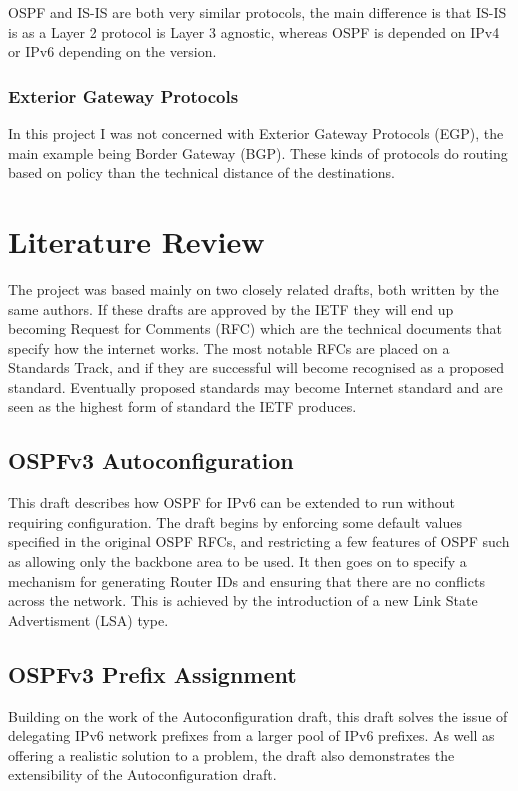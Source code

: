 \documentclass[12pt]{report}
\begin{document}
OSPF and IS-IS are both very similar protocols, the main difference is that
IS-IS is as a Layer 2 protocol is Layer 3 agnostic, whereas OSPF is depended on
IPv4 or IPv6 depending on the version.

\subsection{Exterior Gateway Protocols}
In this project I was not concerned with Exterior Gateway Protocols (EGP), the
main example being Border Gateway (BGP). These kinds of protocols do routing
based on policy than the technical distance of the destinations.

\chapter{Literature Review} 

The project was based mainly on two closely related drafts, both written by the same
authors. If these drafts are approved by the IETF they will end up becoming Request 
for Comments (RFC) which are the technical documents that specify how the internet 
works. The most notable RFCs are placed on a Standards Track, and if they are 
successful will become recognised as a proposed standard. Eventually proposed 
standards may become Internet standard and are seen as the highest form of standard 
the IETF produces. 

\section{OSPFv3 Autoconfiguration}
This draft describes how OSPF for IPv6 can be extended to run without requiring
configuration. The draft begins by enforcing some default values specified in the
original OSPF RFCs, and restricting a few features of OSPF such as allowing only the 
backbone area to be used. It then goes on to specify a mechanism for generating 
Router IDs and ensuring that there are no conflicts across the network. This is 
achieved by the introduction of a new Link State Advertisment (LSA) type.

\section{OSPFv3 Prefix Assignment}
Building on the work of the Autoconfiguration draft, this draft solves
the issue of delegating IPv6 network prefixes from a larger pool of IPv6 
prefixes. As well as offering a realistic solution to a problem, the draft 
also demonstrates the extensibility of the Autoconfiguration draft. 
\end{document}
